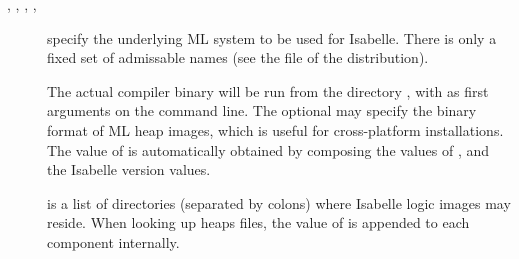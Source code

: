\begin{isabellebody}
\begin{isamarkuptext}
\begin{description}
  \item[\hypertarget{setting.ML-SYSTEM}{\hyperlink{setting.ML-SYSTEM}{\mbox{}}}, \hypertarget{setting.ML-HOME}{\hyperlink{setting.ML-HOME}{\mbox{}}},
  \hypertarget{setting.ML-OPTIONS}{\hyperlink{setting.ML-OPTIONS}{\mbox{}}}, \hypertarget{setting.ML-PLATFORM}{\hyperlink{setting.ML-PLATFORM}{\mbox{}}}, \hypertarget{setting.ML-IDENTIFIER}{\hyperlink{setting.ML-IDENTIFIER}{\mbox{}}}\isa{{\isachardoublequote}\isactrlsup {\isacharasterisk}{\isachardoublequote}}] specify the underlying ML system
  to be used for Isabelle.  There is only a fixed set of admissable
  \hyperlink{setting.ML-SYSTEM}{\mbox{}} names (see the \hyperlink{file.$ISABELLE-HOME/etc/settings}{\mbox{}} file of the distribution).
  
  The actual compiler binary will be run from the directory \hyperlink{setting.ML-HOME}{\mbox{}}, with \hyperlink{setting.ML-OPTIONS}{\mbox{}} as first arguments on the
  command line.  The optional \hyperlink{setting.ML-PLATFORM}{\mbox{}} may specify the
  binary format of ML heap images, which is useful for cross-platform
  installations.  The value of \hyperlink{setting.ML-IDENTIFIER}{\mbox{}} is
  automatically obtained by composing the values of \hyperlink{setting.ML-SYSTEM}{\mbox{}}, \hyperlink{setting.ML-PLATFORM}{\mbox{}} and the Isabelle version values.
  
  \item[\hypertarget{setting.ISABELLE-PATH}{\hyperlink{setting.ISABELLE-PATH}{\mbox{}}}] is a list of directories
  (separated by colons) where Isabelle logic images may reside.  When
  looking up heaps files, the value of \hyperlink{setting.ML-IDENTIFIER}{\mbox{}} is
  appended to each component internally.
  

\end{description}
\end{isamarkuptext}
\end{isabellebody}
